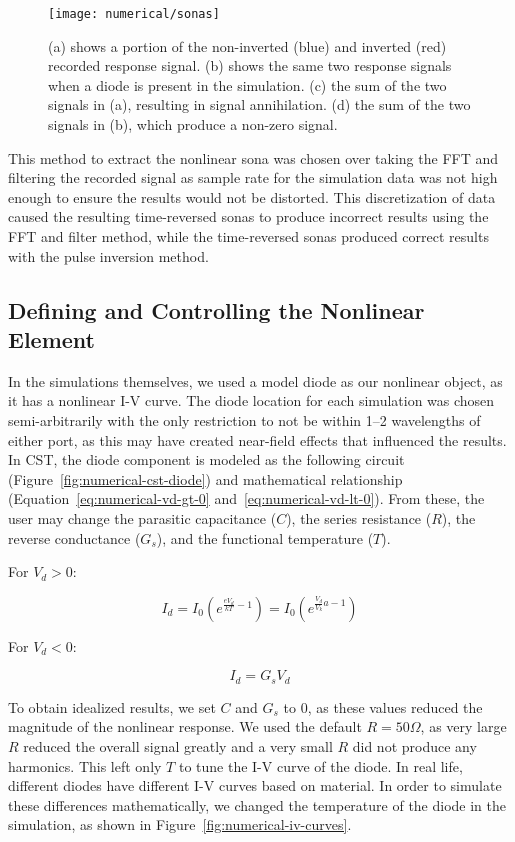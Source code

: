 \begin{figure}[t]
\centering
\texttt{[image: numerical/sonas]}
\caption[Demonstration of pulse inversion]{(a) shows a portion of the non-inverted (blue) and inverted (red) recorded response signal. (b) shows the same two response signals when a diode is present in the simulation. (c) the sum of the two signals in (a), resulting in signal annihilation. (d) the sum of the two signals in (b), which produce a non-zero signal.}
\label{fig:numerical-sonas}
\end{figure}
This method to extract the nonlinear sona was chosen over taking the FFT and filtering the recorded signal as sample rate for the simulation data was not high enough to ensure the results would not be distorted. This discretization of data caused the resulting time-reversed sonas to produce incorrect results using the FFT and filter method, while the time-reversed sonas produced correct results with the pulse inversion method.
\subsection{Defining and Controlling the Nonlinear Element}
In the simulations themselves, we used a model diode as our nonlinear object, as it has a nonlinear I-V curve. The diode location for each simulation was chosen semi-arbitrarily with the only restriction to not be within \numrange{1}{2} wavelengths of either port, as this may have created near-field effects that influenced the results. In CST, the diode component is modeled as the following circuit (Figure~\ref{fig:numerical-cst-diode}) and mathematical relationship (Equation~\ref{eq:numerical-vd-gt-0} and~\ref{eq:numerical-vd-lt-0}). From these, the user may change the parasitic capacitance ($C$), the series resistance ($R$), the reverse conductance ($G_{s}$), and the functional temperature ($T$).

For $V_d > 0$:

\begin{equation}
I_d = I_0\left( e^{\frac{eV_{d}}{kT}-1}\right) = I_0\left( e^{\frac{V_{d}}{V_{k}}a - 1}\right)
\label{eq:numerical-vd-gt-0}
\end{equation}

For $V_d < 0$:

\begin{equation}
I_{d} = G_{s}V_{d}
\label{eq:numerical-vd-lt-0}
\end{equation}


To obtain idealized results, we set $C$ and $G_s$ to $0$, as these values reduced the magnitude of the nonlinear response. We used the default $R = 50 \Omega$, as very large $R$ reduced the overall signal greatly and a very small $R$ did not produce any harmonics. This left only $T$ to tune the I-V curve of the diode. In real life, different diodes have different I-V curves based on material. In order to simulate these differences mathematically, we changed the temperature of the diode in the simulation, as shown in Figure~\ref{fig:numerical-iv-curves}.


